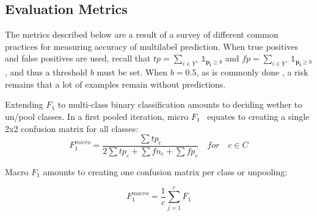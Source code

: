 







\subsection{Evaluation Metrics}
\label{sec:org23c8447}


The metrics described below are a result of a survey of different common practices for measuring accuracy of multilabel prediction. When true positives and false positives are used, recall that \(t p=\sum_{i \in Y^{+}} \mathds{1}_{\mathbf{p_i} \geq b}\) and \(f p=\sum_{i \in Y^{-}} \mathds{1}_{\mathbf{p_i} \geq b}\), and thus a threshold \(b\) must be set. When \(b = 0.5\), as is commonly done , a risk remains that a lot of examples remain without predictions.

Extending \(F_1\) to multi-class binary classification amounts to deciding wether to un/pool classes.
In a first pooled iteration, micro \(F_1\)~\cite{multilabelMetrics} equates to creating a single 2x2 confusion matrix for all classes:
$$F_1^{micro} = \frac{\sum tp_c}{2 \sum tp_c + \sum fn_c + \sum fp_c} \quad for \quad c \in C$$

Macro \(F_1\) \cite{threshForF1, multilabelMetrics} amounts to creating one confusion matrix per class or unpooling:

$$F_1^{macro} = \frac{1}{c} \sum_{j=1}^c F_1$$

